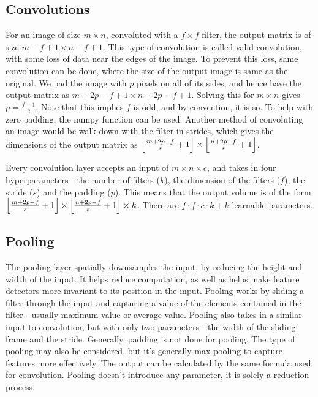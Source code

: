 \documentclass{article}
\newcommand{\code}[1]{{\fontfamily{zi4} \selectfont{#1}}}
\DeclarePairedDelimiter\floor{\lfloor}{\rfloor}
\begin{document}
\subsection{Convolutions}

For an image of size $m \times n$, convoluted with a $f \times f$ filter, the output matrix is of size $m-f+1 \times n-f+1$. This type of convolution is called valid convolution, with some loss of data near the edges of the image. To prevent this loss, same convolution can be done, where the size of the output image is same as the original. We pad the image with $p$ pixels on all of its sides, and hence have the output matrix as $m+2p-f+1 \times n+2p-f+1$. Solving this for $m \times n$ gives $p = \frac{f-1}{2}$. Note that this implies $f$ is odd, and by convention, it is so. To help with zero padding, the numpy function \code{np.pad} can be used. Another method of convoluting an image would be walk down with the filter in strides, which gives the dimensions of the output matrix as $\floor*{\frac{m+2p-f}{s} + 1} \times \floor*{\frac{n+2p-f}{s} + 1}$.

Every convolution layer accepts an input of $m \times n \times c$, and takes in four hyperparameters - the number of filters ($k$), the dimension of the filters ($f$), the stride ($s$) and the padding ($p$). This means that the output volume is of the form $\floor*{\frac{m+2p-f}{s} + 1} \times \floor*{\frac{n+2p-f}{s} + 1} \times k$. There are $f \cdot f \cdot c \cdot k + k$ learnable parameters.

\subsection{Pooling}

The pooling layer spatially downsamples the input, by reducing the height and width of the input. It helps reduce computation, as well as helps make feature detectors more invariant to its position in the input. Pooling works by sliding a filter through the input and capturing a value of the elements contained in the filter - usually maximum value or average value. Pooling also takes in a similar input to convolution, but with only two parameters - the width of the sliding frame and the stride. Generally, padding is not done for pooling. The type of pooling may also be considered, but it's generally max pooling to capture features more effectively. The output can be calculated by the same formula used for convolution. Pooling doesn't introduce any parameter, it is solely a reduction process.
\end{document}
